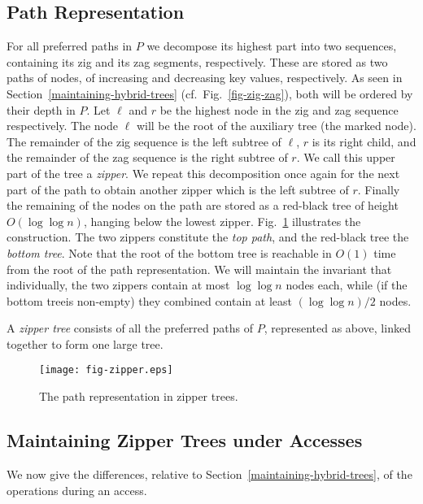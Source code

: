\documentclass[letterpaper,11pt]{article}
\newcommand{\toppath}{top path}
\newcommand{\bottomtree}{bottom tree}
\begin{document}
\subsection{Path Representation} For all preferred paths in $P$ we
decompose its highest part
into two sequences, containing its zig and its zag segments,
respectively. These are stored as two paths of nodes, of increasing and
decreasing key values, respectively. As seen in
Section~\ref{maintaining-hybrid-trees} (cf.\ Fig.~\ref{fig-zig-zag}), both
will be ordered by their depth in $P$. Let $\ell$ and $r$ be the highest
node in the zig and zag sequence respectively. The node $\ell$ will be the
root of the auxiliary tree (the marked node). The remainder of the zig
sequence is the left subtree of $\ell$, $r$ is its right child, and the
remainder of the zag sequence is the right subtree of $r$. We call this
upper part of the tree a \emph{zipper}. We repeat this decomposition once
again for the next part of the path
to obtain another zipper which is the left subtree of $r$. Finally the
remaining of the nodes on the path are stored as a red-black tree of height
$O(\log \log n)$, hanging below the lowest zipper. Fig.~\ref{fig-zipper}
illustrates the construction. The two zippers constitute the
\emph{\toppath}, and the red-black tree the \emph{\bottomtree}. Note that
the root of the \bottomtree{} is reachable in $O(1)$ time from the root of
the path representation. We will maintain the invariant that individually,
the two zippers contain at most $\log\log n$ nodes each, while (if the
\bottomtree is non-empty) they combined contain at least $(\log\log
n)/2$ nodes.

A \emph{zipper tree} consists of all the preferred paths of $P$,
represented as above, linked together to form one large tree.

\begin{figure}\begin{center}
        \texttt{[image: fig-zipper.eps]}
    \end{center}
    \caption{\label{fig-zipper} The path representation in zipper trees.}
\end{figure}

\subsection{Maintaining Zipper Trees under Accesses}

We now give the differences, relative to
Section~\ref{maintaining-hybrid-trees}, of the operations during an access.
\end{document}
